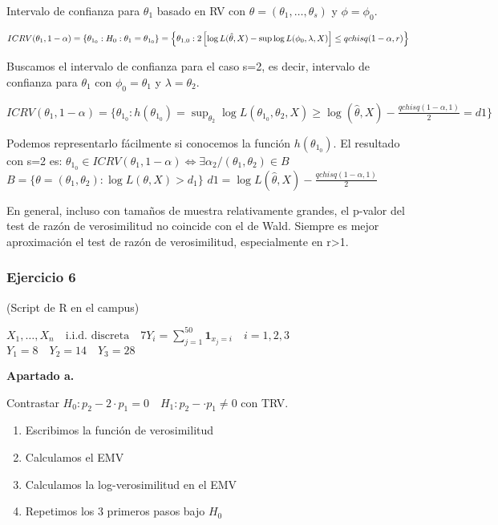 Intervalo de confianza para $\theta_1$ basado en RV con $\theta=(\theta_1,\dots,\theta_s)$ y $\phi=\phi_0$.

\(
ICRV(\theta_1,1-\alpha)=\{\theta_{1_0}:H_0:\theta_1=\theta_{1_0}\}
\\= \left\{ \theta_{1,0} : 2\left[\log L(\hat{\theta},X) - \sup \log L(\phi_0, \lambda, X)\right] \leq qchisq(1 - \alpha, r) \right\}
\) 

Buscamos el intervalo de confianza para el caso s=2, es decir, intervalo de confianza para $\theta_1$ con $\phi_0=\theta_1$ y $\lambda=\theta_2$.

\(
ICRV(\theta_1,1-\alpha)=\{ 
\theta_{1_0}:h(\theta_{1_0})=\sup_{\theta_2} \log L(\theta_{1_0},\theta_2,X) \geq \log(\hat{\theta},X)-\frac{qchisq(1-\alpha,1)}{2}=d1
\}
\)

Podemos representarlo fácilmente si conocemos la función $h(\theta_{1_0})$.
El resultado con s=2 es:
\(
\theta_{1_0} \in  ICRV(\theta_1,1-\alpha) \Longleftrightarrow \exists \alpha_2 / (\theta_1,\theta_2) \in B
\)
\(
B=\{\theta=(\theta_1,\theta_2):\log L(\theta,X)>d_1\}
\)
\(
d1=\log L(\hat{\theta},X)-\frac{qchisq(1-\alpha,1)}{2}
\)

En general, incluso con tamaños de muestra relativamente grandes, el p-valor del test de razón de verosimilitud no coincide con el de Wald.
Siempre es mejor aproximación el test de razón de verosimilitud, especialmente en r>1.

\subsubsection*{Ejercicio 6}
(Script de R en el campus)

\(
X_1,\dots,X_n \quad \text{i.i.d. discreta} \quad 7
Y_i=\sum_{j=1}^{50} \mathbf{1}_{x_j=i} \quad i=1,2,3
\)
\(
Y_1=8 \quad Y_2=14 \quad Y_3=28
\)

\textbf{Apartado a.}

Contrastar $H_0: p_2-2\cdot p_1=0 \quad H_1: p_2-\cdot p_1 \neq 0$
con TRV.
\begin{enumerate}
    \item Escribimos la función de verosimilitud
    \item Calculamos el EMV
    \item Calculamos la log-verosimilitud en el EMV
    \item Repetimos los 3 primeros pasos bajo $H_0$
\end{enumerate}

